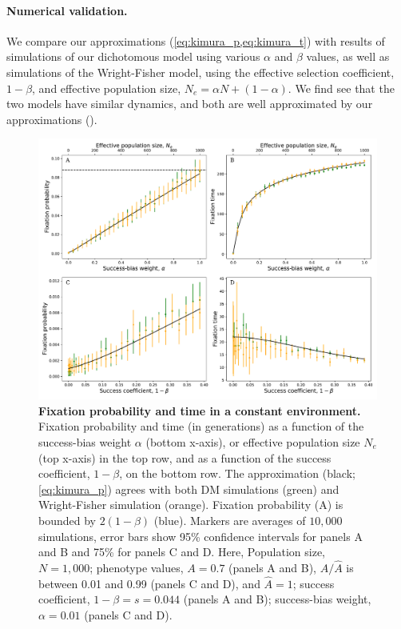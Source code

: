 \documentclass[12pt]{extarticle}
\begin{document}
\paragraph{Numerical validation.}
We compare our approximations (\cref{eq:kimura_p,eq:kimura_t}) with results of simulations of our dichotomous model using various $\alpha$ and $\beta$ values, as well as simulations of the Wright-Fisher model, using the effective selection coefficient, $1-\beta$, and effective population size, $N_e=\alpha N + (1-\alpha)$. 
We find see that the two models have similar dynamics, and both are well approximated {by} our approximations ().


\begin{figure}[h]
    \includegraphics[width=\linewidth]{kimura_var.pdf}
  \caption{\textbf{Fixation probability and time in a constant environment.}
  Fixation probability and time (in generations) as a function of the success-bias weight $\alpha$ (bottom x-axis), or effective population size $N_e$ (top x-axis) in the top row, and as a function of the success coefficient, $1-\beta$, on the bottom row.
  The approximation (black; \cref{eq:kimura_p}) agrees with both DM simulations (green) and Wright-Fisher simulation (orange).
  Fixation probability (A) is bounded by $2(1-\beta)$ (blue).
  Markers are averages of $10,000$ simulations, error bars show 95\% confidence intervals for panels A and B and 75\% for panels C and D.
   Here, Population size, $N=1,000$; phenotype values, $A=0.7$ (panels A and B), 
   $A/\hat{A}$ is between 0.01 and 0.99 (panels C and D), and $\hat{A}=1$; %
   success coefficient, $1-\beta=s=0.044$ (panels A and B); 
   success-bias weight, $\alpha=0.01$ (panels C and D).
   }
  \label{fig:var_alpha}
\end{figure}
\end{document}
